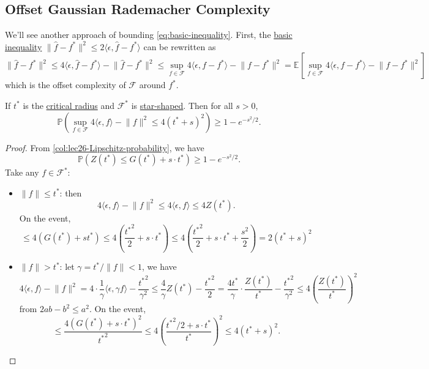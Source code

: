 \subsection{Offset Gaussian Rademacher Complexity}
We'll see another approach of bounding \autoref{eq:basic-inequality}. First, the \hyperref[eq:basic-inequality]{basic inequality} \(\lVert \hat{f} - f^{\ast}  \rVert ^2 \leq 2 \langle \epsilon , \hat{f} - f^{\ast} \rangle\) can be rewritten as
\[
	\lVert \hat{f} - f^{\ast}  \rVert ^2 \leq 4 \langle \epsilon , \hat{f} - f^{\ast}  \rangle - \lVert \hat{f} - f^{\ast} \rVert ^2
	\leq \sup _{f\in \mathscr{F} } 4 \langle \epsilon , f - f^{\ast}  \rangle - \lVert f - f^{\ast}  \rVert ^2
	= \mathbb{E}_{}\left[\sup _{f\in \mathscr{F} } 4 \langle \epsilon , f - f^{\ast}  \rangle - \lVert f - f^{\ast}  \rVert ^2 \right]
\]
which is the offset complexity of \(\mathscr{F} \) around \(f^{\ast} \).

\begin{theorem}
	If \(t^{\ast} \) is the \hyperref[def:critical-radius]{critical radius} and \(\mathscr{F} ^{\ast} \) is \hyperref[def:star-shaped]{star-shaped}. Then for all \(s > 0\),
	\[
		\mathbb{P} \left( \sup _{f\in \mathscr{F} } 4 \langle \epsilon , f \rangle - \lVert f \rVert ^2 \leq 4 (t^{\ast} + s)^2 \right) \geq 1 - e^{-s^2 / 2}.
	\]
\end{theorem}
\begin{proof}
	From \autoref{col:lec26-Lipschitz-probability}, we have
	\[
		\mathbb{P} \left( Z(t^{\ast} ) \leq G(t^{\ast} ) + s \cdot t^{\ast}  \right) \geq 1 - e^{- s^2 / 2}.
	\]
	Take any \(f \in \mathscr{F} ^{\ast} \):
	\begin{itemize}
		\item \(\lVert f \rVert \leq t^{\ast} \): then
		      \[
			      4 \langle \epsilon , f \rangle - \lVert f \rVert ^2
			      \leq 4 \langle \epsilon , f \rangle
			      \leq 4 Z(t^{\ast} ).
		      \]
		      On the event,
		      \[
			      \leq 4 (G(t^{\ast} ) + s t^{\ast} )
			      \leq 4 \left( \frac{{t^{\ast} }^2}{2} + s \cdot t^{\ast} \right)
			      \leq 4 \left( \frac{{t^{\ast} }^2}{2} + s \cdot t^{\ast} + \frac{s^2}{2}\right)
			      = 2(t^{\ast} + s)^2
		      \]
		\item \(\lVert f \rVert > t^{\ast} \): let \(\gamma = t^{\ast} / \lVert f \rVert < 1\), we have
		      \[
			      4 \langle \epsilon , f \rangle - \lVert f \rVert ^2
			      = 4 \cdot \frac{1}{\gamma } \langle \epsilon , \gamma f \rangle - \frac{{t^{\ast} }^2}{\gamma ^2}
			      \leq \frac{4}{\gamma } Z(t^{\ast} ) - \frac{{t^{\ast} }^2}{2}
			      = \frac{4 t^{\ast} }{\gamma } \cdot \frac{Z(t^{\ast} )}{t^{\ast} } - \frac{{t^{\ast} }^2}{\gamma ^2}
			      \leq 4 \left( \frac{Z(t^{\ast} )}{t^{\ast} } \right) ^2
		      \]
		      from \(2ab - b^2 \leq a^2\). On the event,
		      \[
			      \leq \frac{4 ( G(t^{\ast} ) + s\cdot t^{\ast} )^2}{{t^{\ast} }^2}
			      \leq 4 \left( \frac{{t^{\ast} }^2 / 2 + s\cdot t^{\ast} }{t^{\ast} } \right) ^2
			      \leq 4 ( t^{\ast} + s)^2.
		      \]
	\end{itemize}
\end{proof}


